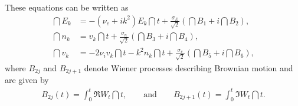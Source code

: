 \documentclass[10pt,a4paper]{article}
\begin{document}
These equations can be written as
\begin{align}
\dint{E_k}&=-(\nu_e+ik^2)E_k\dint{t}+\frac{\sigma_E}{\sqrt{2}}
\left(\dint{B_{1}}+i\dint{B_{2}}\right),
\label{eq:sde0}\\
\dint{n_k}&=v_k\dint{t}+\frac{\sigma_n}{\sqrt{2}}
\left(\dint{B_{3}}+i\dint{B_{4}}\right),
\label{eq:sde20}\\
\dint{v_k}&=-2\nu_i v_k\dint{t}-k^2n_k\dint{t}+\frac{\sigma_v}{\sqrt{2}}
\left(\dint{B_{5}}+i\dint{B_{6}}\right),
\label{eq:sde21}
\end{align}
where $B_{2j}$ and $B_{2j{+}1}$ denote Wiener processes describing 
Brownian motion and are given by
\begin{align}
B_{2j}(t) = \int_0^t\Re{W_t}\dint{t},\qquad\text{and}\qquad
B_{2j{+}1}(t) = \int_0^t\Im{W_t}\dint{t}.\nonumber
\end{align}
\end{document}
